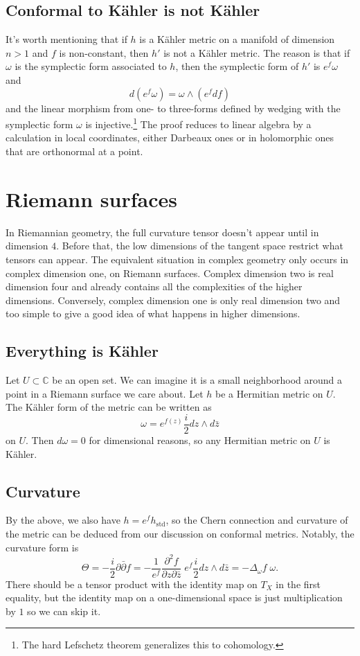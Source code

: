 \documentclass[11pt]{article}
\theoremstyle{definition}
\newcommand{\kk}[1]{\mathbb{#1}}
\begin{document}
\subsection{Conformal to K\"ahler is not K\"ahler}
\label{sec:org7b1cfdf}

It's worth mentioning that if \(h\) is a K\"ahler metric on a manifold of dimension \(n > 1\) and \(f\) is non-constant, then \(h'\) is not a K\"ahler metric. The reason is that if \(\omega\) is the symplectic form associated to \(h\), then the symplectic form of \(h'\) is \(e^f \omega\) and
$$
d(e^f \omega) = \omega \wedge (e^f df)
$$
and the linear morphism from one- to three-forms defined by wedging with the symplectic form \(\omega\) is injective.\footnote{The hard Lefschetz theorem generalizes this to cohomology.}
The proof reduces to linear algebra by a calculation in local coordinates, either Darbeaux ones or in holomorphic ones that are orthonormal at a point.


\section{Riemann surfaces}
\label{sec:org776713b}

In Riemannian geometry, the full curvature tensor doesn't appear until in dimension $4$. Before that, the low dimensions of the tangent space restrict what tensors can appear. The equivalent situation in complex geometry only occurs in complex dimension one, on Riemann surfaces. Complex dimension two is real dimension four and already contains all the complexities of the higher dimensions. Conversely, complex dimension one is only real dimension two and too simple to give a good idea of what happens in higher dimensions.

\subsection{Everything is K\"ahler}
Let $U \subset \kk C$ be an open set. We can imagine it is a small neighborhood around a point in a Riemann surface we care about. Let $h$ be a Hermitian metric on $U$. The K\"ahler form of the metric can be written as
$$
\omega = e^{f(z)} \frac{i}{2} dz \wedge d\bar z
$$
on $U$. Then $d\omega = 0$ for dimensional reasons, so any Hermitian metric on $U$ is K\"ahler.

\subsection{Curvature}
By the above, we also have $h = e^f h_{\mathrm{std}}$, so the Chern connection and curvature of the metric can be deduced from our discussion on conformal metrics. Notably, the curvature form is
$$
\Theta
= -\frac i2\partial\bar\partial f
= -\frac{1}{e^f}\frac{\partial^2f}{\partial z \partial \bar z} \; e^f \frac{i}{2} dz \wedge d\bar z
= -\Delta_\omega f \; \omega.
$$
There should be a tensor product with the identity map on $T_X$ in the first equality, but the identity map on a one-dimensional space is just multiplication by $1$ so we can skip it.
\end{document}
